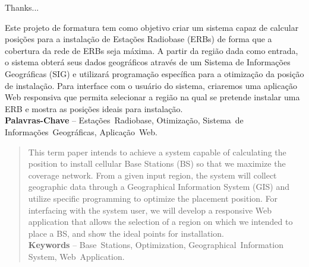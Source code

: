 \documentclass[]{politex}
\begin{document}
\capa
\falsafolhaderosto
\folhaderosto








\begin{agradecimentos}

Thanks...

\end{agradecimentos}




\begin{resumo}
Este projeto de formatura tem como objetivo criar um sistema capaz de calcular
posições para a instalação de Estações Radiobase (ERBs) de forma que a
cobertura da rede de ERBs seja máxima. A partir da região dada como entrada, o
sistema obterá seus dados geográficos através de um Sistema de Informações
Geográficas (SIG) e utilizará programação específica para a otimização da posição
de instalação. Para interface com o usuário do sistema, criaremos uma aplicação
Web responsiva que permita selecionar a região na qual se pretende instalar uma
ERB e mostra as posições ideais para instalação.
\\[3\baselineskip]
%
\textbf{Palavras-Chave} -- Estações~Radiobase, Otimização, Sistema~de~
Informações~Geográficas, Aplicação~Web.
\end{resumo}


\begin{abstract}
This term paper intends to achieve a system capable of calculating the position
to install cellular Base Stations (BS) so that we maximize the coverage network.
From a given input region, the system will collect geographic data through a
Geographical Information System (GIS) and utilize specific programming to optimize
the placement position. For interfacing with the system user, we will develop a
responsive Web application that allows the selection of a region on which we
intended to place a BS, and show the ideal points for installation.
\\[3\baselineskip]
%
\textbf{Keywords} -- Base~Stations, Optimization, Geographical~Information~
System, Web~Application.
\end{abstract}
\end{document}
